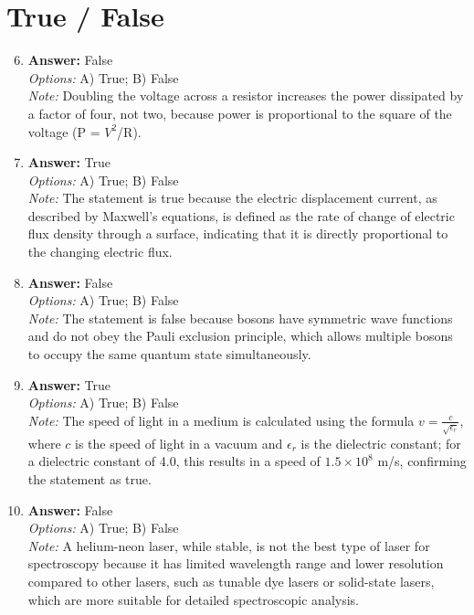 \documentclass[12pt]{article}
\begin{document}
\section*{True / False}
\begin{enumerate}[label=\arabic*.]
\setcounter{enumi}{5}
\item \textbf{Answer:} False
\\ \textit{Options:} A) True; B) False
\\ \textit{Note:} Doubling the voltage across a resistor increases the power dissipated by a factor of four, not two, because power is proportional to the square of the voltage (P = $V^2$/R).
\item \textbf{Answer:} True
\\ \textit{Options:} A) True; B) False
\\ \textit{Note:} The statement is true because the electric displacement current, as described by Maxwell's equations, is defined as the rate of change of electric flux density through a surface, indicating that it is directly proportional to the changing electric flux.
\item \textbf{Answer:} False
\\ \textit{Options:} A) True; B) False
\\ \textit{Note:} The statement is false because bosons have symmetric wave functions and do not obey the Pauli exclusion principle, which allows multiple bosons to occupy the same quantum state simultaneously.
\item \textbf{Answer:} True
\\ \textit{Options:} A) True; B) False
\\ \textit{Note:} The speed of light in a medium is calculated using the formula \( v = \frac{c}{\sqrt{\epsilon_r}} \), where \( c \) is the speed of light in a vacuum and \( \epsilon_r \) is the dielectric constant; for a dielectric constant of 4.0, this results in a speed of \( 1.5 \times 10^8 \) m/s, confirming the statement as true.
\item \textbf{Answer:} False
\\ \textit{Options:} A) True; B) False
\\ \textit{Note:} A helium-neon laser, while stable, is not the best type of laser for spectroscopy because it has limited wavelength range and lower resolution compared to other lasers, such as tunable dye lasers or solid-state lasers, which are more suitable for detailed spectroscopic analysis.
\end{enumerate}
\end{document}

